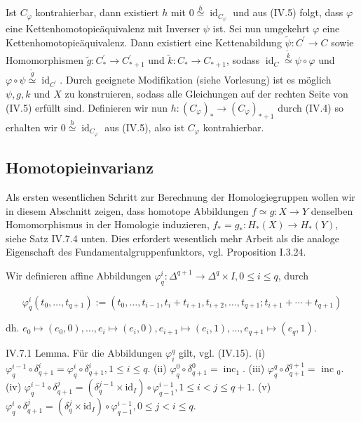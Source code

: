 \documentclass[10pt, letterpaper]{article}
\begin{document}
Ist $C_{\varphi}$ kontrahierbar, dann existiert $h$ mit $0 \stackrel{h}{\simeq} \operatorname{id}_{C_{\varphi}}$ und aus (IV.5) folgt, dass $\varphi$ eine Kettenhomotopieäquivalenz mit Inverser $\psi$ ist. Sei nun umgekehrt $\varphi$ eine Kettenhomotopieäquivalenz. Dann existiert eine Kettenabildung $\tilde{\psi}: C^{\prime} \rightarrow C$ sowie Homomorphismen $\tilde{g}: C_*^{\prime} \rightarrow C_{*+1}^{\prime}$ und $\tilde{k}: C_* \rightarrow C_{*+1}$, sodass $\operatorname{id}_C \stackrel{\tilde{k}}{\simeq} \psi \circ \varphi$ und $\varphi \circ \psi \stackrel{\tilde{g}}{\simeq} \operatorname{id}_{C^{\prime}}$. Durch geeignete Modifikation (siehe Vorlesung) ist es möglich $\psi, g, k$ und $X$ zu konstruieren, sodass alle Gleichungen auf der rechten Seite von (IV.5) erfüllt sind. Definieren wir nun $h:\left(C_{\varphi}\right)_* \rightarrow\left(C_{\varphi}\right)_{*+1}$ durch (IV.4) so erhalten wir $0 \stackrel{h}{\simeq} \operatorname{id}_{C_{\varphi}}$ aus (IV.5), also ist $C_{\varphi}$ kontrahierbar.


\pagebreak


\subsection{Homotopieinvarianz}

Als ersten wesentlichen Schritt zur Berechnung der Homologiegruppen wollen wir in diesem Abschnitt zeigen, dass homotope Abbildungen $f \simeq g: X \rightarrow Y$ denselben Homomorphismus in der Homologie induzieren, $f_*=g_*: H_*(X) \rightarrow H_*(Y)$, siehe Satz IV.7.4 unten. Dies erfordert wesentlich mehr Arbeit als die analoge Eigenschaft des Fundamentalgruppenfunktors, vgl. Proposition I.3.24.

Wir definieren affine Abbildungen $\varphi_q^i: \Delta^{q+1} \rightarrow \Delta^q \times I, 0 \leq i \leq q$, durch

$$
\varphi_q^i\left(t_0, \ldots, t_{q+1}\right):=\left(t_0, \ldots, t_{i-1}, t_i+t_{i+1}, t_{i+2}, \ldots, t_{q+1} ; t_{i+1}+\cdots+t_{q+1}\right)
$$

dh. $e_0 \mapsto\left(e_0, 0\right), \ldots, e_i \mapsto\left(e_i, 0\right), e_{i+1} \mapsto\left(e_i, 1\right), \ldots, e_{q+1} \mapsto\left(e_q, 1\right)$.


IV.7.1 Lemma. Für die Abbildungen $\varphi_i^q$ gilt, vgl. (IV.15).
(i) $\varphi_q^{i-1} \circ \delta_{q+1}^i=\varphi_q^i \circ \delta_{q+1}^i, 1 \leq i \leq q$.
(ii) $\varphi_q^0 \circ \delta_{q+1}^0=\operatorname{inc}_1$.
(iii) $\varphi_q^q \circ \delta_{q+1}^{q+1}=$ inc $_0$.
(iv) $\varphi_q^{i-1} \circ \delta_{q+1}^j=\left(\delta_q^{j-1} \times \mathrm{id}_I\right) \circ \varphi_{q-1}^{i-1}, 1 \leq i<j \leq q+1$.
(v) $\varphi_q^i \circ \delta_{q+1}^j=\left(\delta_q^j \times \mathrm{id}_I\right) \circ \varphi_{q-1}^{i-1}, 0 \leq j<i \leq q$.
\end{document}
